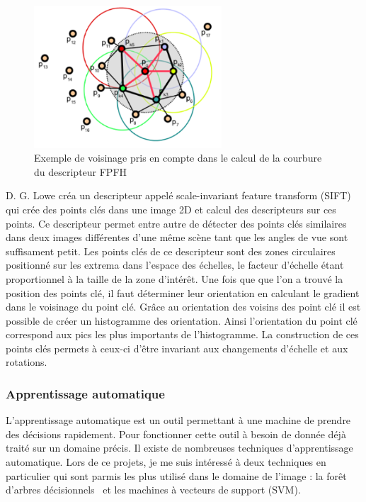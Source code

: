 \begin{figure}[!ht]
  \begin{center}
    \includegraphics[width=7cm]{image/FPFH.png}
    \caption{Exemple de voisinage pris en compte dans le calcul de la courbure du descripteur FPFH}
    \label{fig:fpfhNeighborhood}
  \end{center}
\end{figure}

D. G. Lowe\cite{SIFT} créa un descripteur appelé \og scale-invariant feature transform \fg(SIFT) qui crée
des points clés dans une image 2D et calcul des descripteurs sur ces points. Ce descripteur permet entre autre
de détecter des points clés similaires dans deux images différentes d'une même scène tant que les angles de vue
sont suffisament petit. Les points clés de ce descripteur sont des zones circulaires positionné sur les extrema 
dans l'espace des échelles, le facteur d'échelle étant proportionnel à la taille de la zone d'intérêt. Une fois que
que l'on a trouvé la position des points clé, il faut déterminer leur orientation en calculant le gradient dans le voisinage
du point clé. Grâce au orientation des voisins des point clé il est possible de créer un histogramme des orientation. Ainsi
l'orientation du point clé correspond aux pics les plus importants de l'histogramme.
La construction de ces points clés permets à ceux-ci d'être invariant aux changements d'échelle et aux rotations.

\subsubsection{Apprentissage automatique}
L'apprentissage automatique est un outil permettant à une machine de prendre des décisions rapidement.
Pour fonctionner cette outil à besoin de donnée déjà traité sur un domaine précis. Il existe de nombreuses
techniques d'apprentissage automatique. Lors de ce projets, je me suis intéressé à deux techniques en 
particulier qui sont parmis les plus utilisé dans le domaine de l'image : la \og forêt d'arbres décisionnels \fg \ et les
\og machines à vecteurs de support \fg (SVM).\\

